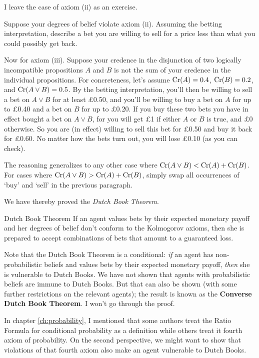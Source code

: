 I leave the case of axiom (ii) as an exercise.

\begin{exercise2}
  Suppose your degrees of belief violate axiom (ii). Assuming the
  betting interpretation, describe a bet you are willing to sell for a
  price less than what you could possibly get back.
\end{exercise2}

Now for axiom (iii). Suppose your credence in the disjunction of two
logically incompatible propositions $A$ and $B$ is not the sum of your
credence in the individual propositions. For concreteness, let's
assume $\text{Cr}(A) = 0.4$, $\text{Cr}(B) = 0.2$, and $\text{Cr}(A \lor B) = 0.5$. By
the betting interpretation, you'll then be willing to sell a bet on $A
\lor B$ for at least £0.50, and you'll be willing to buy a bet on $A$
for up to £0.40 and a bet on $B$ for up to £0.20. If you
buy these two bets you have in effect bought a bet on $A \lor B$, for
you will get £1 if either $A$ or $B$ is true, and £0 otherwise. So you
are (in effect) willing to sell this bet for £0.50 and buy it back for
£0.60. No matter how the bets turn out, you will lose £0.10
(as you can check).

The reasoning generalizes to any other case where
$\text{Cr}(A \lor B) < \text{Cr}(A) + \text{Cr}(B)$. For cases where
$\text{Cr}(A \lor B) > \text{Cr}(A) + \text{Cr}(B)$, simply swap all occurrences of
`buy' and `sell' in the previous paragraph.

We have thereby proved the \emph{Dutch Book Theorem}.

\begin{genericthm}{Dutch Book Theorem}
  If an agent values bets by their expected monetary payoff and her
  degrees of belief don't conform to the Kolmogorov axioms, then she
  is prepared to accept combinations of bets that amount to a
  guaranteed loss. 
\end{genericthm}

Note that the Dutch Book Theorem is a conditional: \emph{if} an agent
has non-probabilistic beliefs and values bets by their expected
monetary payoff, \emph{then} she is vulnerable to Dutch Books. We have
not shown that agents with probabilistic beliefs are immune to Dutch
Books. But that can also be shown (with some further
restrictions on the relevant agents); the result is known as the
\textbf{Converse Dutch Book Theorem}. I won't go through the proof.

In chapter \ref{ch:probability}, I mentioned that some authors treat
the Ratio Formula for conditional probability as a definition while
others treat it fourth axiom of probability. On the second
perspective, we might want to show that violations of that fourth
axiom also make an agent vulnerable to Dutch Books.

